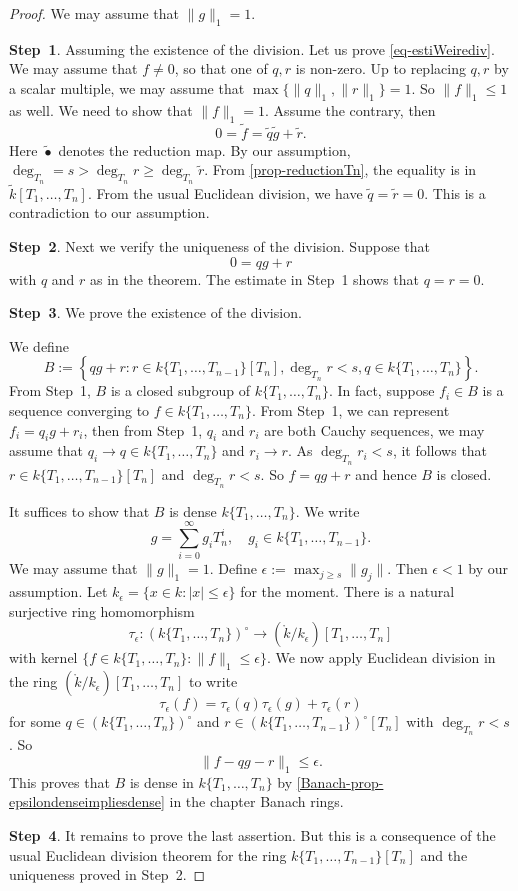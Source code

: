 \begin{proof}
    We may assume that $\|g\|_1=1$.

    \textbf{Step~1}. Assuming the existence of the division. Let us prove \eqref{eq-estiWeirediv}. We may assume that $f\neq 0$, so that one of $q,r$ is non-zero. Up to replacing $q,r$ by a scalar multiple, we may assume that $\max\{\|q\|_1,\|r\|_1\}=1$. So $\|f\|_1\leq 1$ as well. We need to show that $\|f\|_1= 1$. Assume the contrary, then 
    \[
        0=\tilde{f} =\tilde{q}\tilde{g}+\tilde{r}. 
    \]
    Here $\tilde{\bullet}$ denotes the reduction map. By our assumption, $\deg_{T_n}=s>\deg_{T_n}r\geq \deg_{T_n}\tilde{r}$. From  \cref{prop-reductionTn}, the equality is in $\tilde{k}[T_1,\ldots,T_n]$. From the usual Euclidean division, we have $\tilde{q}=\tilde{r}=0$. This is a contradiction to our assumption.

    \textbf{Step~2}. Next we verify the uniqueness of the division. Suppose that 
    \[
        0=qg+r  
    \]
    with $q$ and $r$ as in the theorem. The estimate in Step~1 shows that $q=r=0$.

    \textbf{Step~3}. We prove the existence of the division.

    We define
    \[
        B:=\left\{qg+r:r\in k\{T_1,\ldots,T_{n-1}\}[T_n], \deg_{T_n}r<s,q\in k\{T_1,\ldots,T_{n}\}\right\}.
    \]
    From Step~1, $B$ is a closed subgroup of $k\{T_1,\ldots,T_{n}\}$. In fact, suppose $f_i\in B$ is a sequence converging to $f\in k\{T_1,\ldots,T_{n}\}$. From Step~1, we can represent $f_i=q_ig+r_i$, then from Step~1, $q_i$ and $r_i$ are both Cauchy sequences, we may assume that $q_i\to q\in k\{T_1,\ldots,T_{n}\}$ and $r_i\to r$. As $\deg_{T_n}r_i<s$, it follows that $r\in k\{T_1,\ldots,T_{n-1}\}[T_n]$ and $\deg_{T_n}r<s$. So $f=qg+r$ and hence $B$ is closed.

    It suffices to show that $B$ is dense $k\{T_1,\ldots,T_{n}\}$. We write 
    \[
      g=\sum_{i=0}^{\infty}g_i T_n^{i},\quad g_i\in k\{T_1,\ldots,T_{n-1}\}.  
    \]
    We may assume that $\|g\|_1=1$.
    Define $\epsilon:=\max_{j\geq s} \|g_j\|$. Then $\epsilon<1$ by our assumption. Let $k_{\epsilon}=\{x\in k:|x|\leq \epsilon\}$ for the moment. There is a natural surjective ring homomorphism 
    \[
        \tau_{\epsilon}:(k\{T_1,\ldots,T_n\} )^{\circ}\rightarrow (\mathring{k}/k_{\epsilon})[T_1,\ldots,T_n]
    \] 
    with kernel $\{f\in k\{T_1,\ldots,T_n\}  : \|f\|_1\leq \epsilon\}$.  We now apply Euclidean division in the ring $(\mathring{k}/k_{\epsilon})[T_1,\ldots,T_n]$ to write
    \[
        \tau_{\epsilon}(f)=\tau_{\epsilon}(q)\tau_{\epsilon}(g)+\tau_{\epsilon}(r)
    \]
    for some $q\in (k\{T_1,\ldots,T_n\} )^{\circ}$ and $r\in (k\{T_1,\ldots,T_{n-1}\} )^{\circ}[T_n]$ with $\deg_{T_n}r<s$. So
    \[
        \|f-qg-r\|_1\leq \epsilon.  
    \]
    This proves that $B$ is dense in $k\{T_1,\ldots,T_{n}\}$ by \cref{Banach-prop-epsilondenseimpliesdense} in the chapter Banach rings.

    \textbf{Step~4}. It remains to prove the last assertion. But this is a consequence of the usual Euclidean division theorem for the ring $k\{T_1,\ldots,T_{n-1}\}[T_n]$ and the uniqueness proved in Step~2.
\end{proof}
